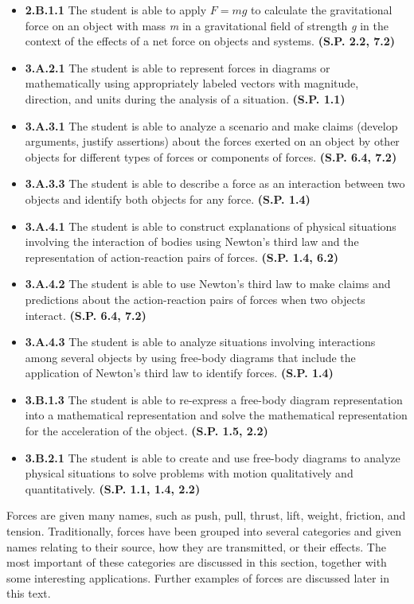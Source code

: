 \documentclass[
]{book}
\providecommand{\tightlist}{%
  \setlength{\itemsep}{0pt}\setlength{\parskip}{0pt}}
\begin{document}
\begin{itemize}
\tightlist
\item
  \textbf{2.B.1.1} The student is able to apply \(F = mg\) to calculate the
  gravitational force on an object with mass \emph{m} in a gravitational
  field of strength \emph{g} in the context of the effects of a net force
  on objects and systems. \textbf{(S.P. 2.2, 7.2)}
\item
  \textbf{3.A.2.1} The student is able to represent forces in diagrams or
  mathematically using appropriately labeled vectors with magnitude,
  direction, and units during the analysis of a situation. \textbf{(S.P.
  1.1)}
\item
  \textbf{3.A.3.1} The student is able to analyze a scenario and make
  claims (develop arguments, justify assertions) about the forces
  exerted on an object by other objects for different types of forces
  or components of forces. \textbf{(S.P. 6.4, 7.2)}
\item
  \textbf{3.A.3.3} The student is able to describe a force as an
  interaction between two objects and identify both objects for any
  force. \textbf{(S.P. 1.4)}
\item
  \textbf{3.A.4.1} The student is able to construct explanations of
  physical situations involving the interaction of bodies using
  Newton's third law and the representation of action-reaction pairs
  of forces. \textbf{(S.P. 1.4, 6.2)}
\item
  \textbf{3.A.4.2} The student is able to use Newton's third law to make
  claims and predictions about the action-reaction pairs of forces
  when two objects interact. \textbf{(S.P. 6.4, 7.2)}
\item
  \textbf{3.A.4.3} The student is able to analyze situations involving
  interactions among several objects by using free-body diagrams that
  include the application of Newton's third law to identify forces.
  \textbf{(S.P. 1.4)}
\item
  \textbf{3.B.1.3} The student is able to re-express a free-body diagram
  representation into a mathematical representation and solve the
  mathematical representation for the acceleration of the object.
  \textbf{(S.P. 1.5, 2.2)}
\item
  \textbf{3.B.2.1} The student is able to create and use free-body diagrams
  to analyze physical situations to solve problems with motion
  qualitatively and quantitatively. \textbf{(S.P. 1.1, 1.4, 2.2)}
\end{itemize}

Forces are given many names, such as push, pull, thrust, lift, weight,
friction, and tension. Traditionally, forces have been grouped into
several categories and given names relating to their source, how they
are transmitted, or their effects. The most important of these
categories are discussed in this section, together with some interesting
applications. Further examples of forces are discussed later in this
text.
\end{document}
